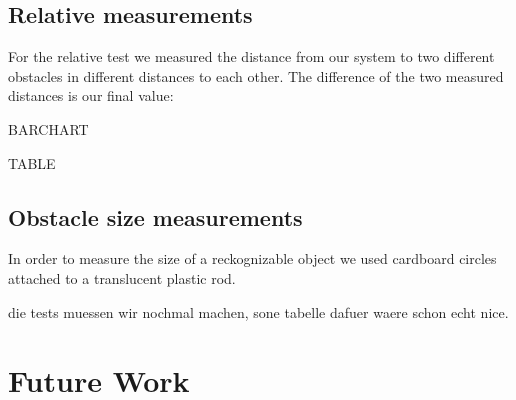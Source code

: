 \documentclass[11pt]{article}
\begin{document}
\subsection{Relative measurements}
For the relative test we measured the distance from our system to two different obstacles in different distances to each other. The difference of the two measured distances is our final value:

BARCHART

TABLE

\subsection{Obstacle size measurements}
In order to measure the size of a reckognizable object we used cardboard circles attached to a translucent plastic rod.

die tests muessen wir nochmal machen, sone tabelle dafuer waere schon echt nice.

\section{Future Work}

\nocite{*}


\end{document}
